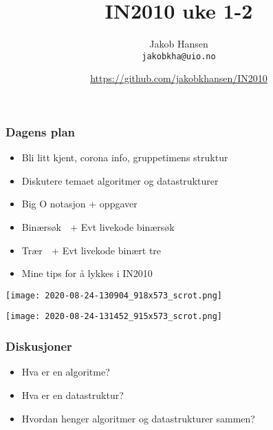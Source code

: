 \documentclass[norsk, handout]{beamer}
\title{IN2010 uke 1-2}
\author{Jakob Hansen \\ \texttt{jakobkha@uio.no}}
\date{\url{https://github.com/jakobkhansen/IN2010}}
\begin{document}
	\frame{\titlepage}
    \begin{frame}
        \frametitle{Dagens plan}
        \center
        \begin{itemize}
            \item Bli litt kjent, corona info, gruppetimens struktur
            \item Diskutere temaet algoritmer og datastrukturer
                \item Big O notasjon + oppgaver
            \item Binærsøk {\Emoji 🔎} + Evt livekode binærsøk
            \item Trær {\Emoji 🌲} + Evt livekode binært tre
            \item Mine tips for å lykkes i IN2010
        \end{itemize}
    \end{frame}

    \begin{frame}
        \begin{center}
            \texttt{[image: 2020-08-24-130904\_918x573\_scrot.png]}
        \end{center}
    \end{frame}

    \begin{frame}
        \begin{center}
            \texttt{[image: 2020-08-24-131452\_915x573\_scrot.png]}
        \end{center}
    \end{frame}

    \begin{frame}
        \frametitle{Diskusjoner}
        \begin{itemize}
            \item Hva er en algoritme?
            \pause
            \item Hva er en datastruktur?
            \pause
        \item Hvordan henger algoritmer og datastrukturer sammen? {\Emoji 🤝}
        \end{itemize}
    \end{frame}
\end{document}
